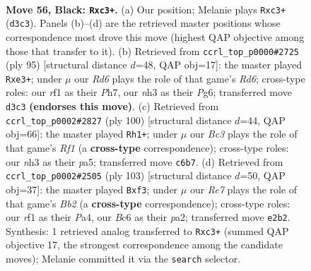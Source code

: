 \documentclass[11pt]{article}
\begin{document}
\clearpage

\begin{figure}[p]\centering
\begin{subfigure}{0.46\textwidth}\centering
\resizebox{\linewidth}{!}{%
\newchessgame
\chessboard[
  setfen={8/6k1/1pb5/p1p5/8/K1Pr2PN/1N2rp1P/5R2 b - - 9 56},
  showmover=false,
  pgfstyle=straightmove, color=movearrow, markmove={d3-c3}
]}
\caption{}
\end{subfigure}\hfill
\begin{subfigure}{0.46\textwidth}\centering
\resizebox{\linewidth}{!}{%
\newchessgame
\chessboard[
  setfen={6k1/7p/6p1/R1N3P1/4p2P/3rP3/4K3/6b1 b - - 14 48},
  showmover=false,
  pgfstyle=straightmove, color=movearrow, markmove={d3-e3}
]}
\caption{}
\end{subfigure}
\\[4pt]
\begin{subfigure}{0.46\textwidth}\centering
\resizebox{\linewidth}{!}{%
\newchessgame
\chessboard[
  setfen={8/1p6/2p1R1pk/p1P3n1/Pr4P1/1P4K1/8/5R2 w - - 1 51},
  showmover=false,
  pgfstyle=straightmove, color=movearrow, markmove={f1-h1}
]}
\caption{}
\end{subfigure}\hfill
\begin{subfigure}{0.46\textwidth}\centering
\resizebox{\linewidth}{!}{%
\newchessgame
\chessboard[
  setfen={3k4/1b5p/7P/1pP1N1p1/p2p1r2/1P3P2/P4K2/6R1 b - - 1 52},
  showmover=false,
  pgfstyle=straightmove, color=movearrow, markmove={b7-f3}
]}
\caption{}
\end{subfigure}
\caption{\textbf{Move 56, Black: \texttt{Rxc3+}.} (a) Our position; Melanie plays \texttt{Rxc3+} (\texttt{d3c3}). Panels (b)--(d) are the retrieved master positions whose correspondence most drove this move (highest QAP objective among those that transfer to it). (b) Retrieved from \texttt{ccrl\_top\_p0000\#2725} (ply 95) [structural distance $d$=48, QAP obj=17]: the master played \texttt{Rxe3+}; under $\mu$ our \emph{Rd6} plays the role of that game's \emph{Rd6}; cross-type roles: our \emph{r}f1 as their \emph{P}h7, our \emph{n}h3 as their \emph{P}g6; transferred move \texttt{d3c3} \textbf{(endorses this move)}. (c) Retrieved from \texttt{ccrl\_top\_p0002\#2827} (ply 100) [structural distance $d$=44, QAP obj=66]: the master played \texttt{Rh1+}; under $\mu$ our \emph{Bc3} plays the role of that game's \emph{Rf1} (a \textbf{cross-type} correspondence); cross-type roles: our \emph{n}h3 as their \emph{p}a5; transferred move \texttt{c6b7}. (d) Retrieved from \texttt{ccrl\_top\_p0002\#2505} (ply 103) [structural distance $d$=50, QAP obj=37]: the master played \texttt{Bxf3}; under $\mu$ our \emph{Re7} plays the role of that game's \emph{Bb2} (a \textbf{cross-type} correspondence); cross-type roles: our \emph{r}f1 as their \emph{P}a4, our \emph{B}c6 as their \emph{p}a2; transferred move \texttt{e2b2}. Synthesis: 1 retrieved analog transferred to \texttt{Rxc3+} (summed QAP objective 17, the strongest correspondence among the candidate moves); Melanie committed it via the \texttt{search} selector.}
\label{fig:thought-m111}
\end{figure}
\end{document}
